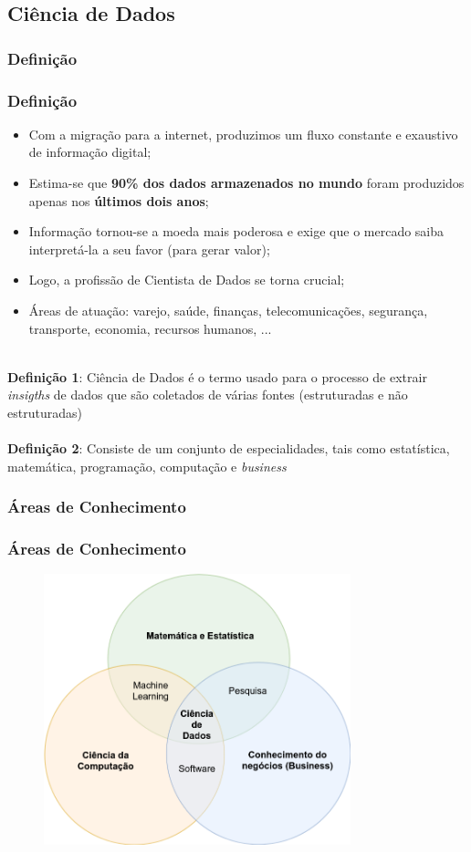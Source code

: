 \documentclass[10pt,xcolor=table]{beamer}
\begin{document}
\subsection{Ciência de Dados}
\subsubsection{Definição}
\begin{frame}\frametitle{Definição} 
  \begin{itemize}
    \item Com a migração para a internet, produzimos um fluxo constante e exaustivo de informação digital;
    \item Estima-se que \textbf{90\% dos dados armazenados no mundo} foram produzidos apenas nos \textbf{últimos dois anos};
    \item Informação tornou-se a moeda mais poderosa e exige que o mercado saiba interpretá-la a seu favor (para gerar valor);
    \item Logo, a profissão de Cientista de Dados se torna crucial;
    \item Áreas de atuação: varejo, saúde, finanças, telecomunicações, segurança, transporte, economia, recursos humanos, ...\\~\\
  \end{itemize}
\textbf{Definição 1}: Ciência de Dados é o termo usado para o processo de extrair \emph{insigths} de dados que são coletados de várias fontes (estruturadas e não estruturadas) \\~\\
\textbf{Definição 2}: Consiste de um conjunto de especialidades, tais como estatística, matemática, programação, computação e \emph{business}
\end{frame}

\subsubsection{Áreas de Conhecimento}
\begin{frame}\frametitle{Áreas de Conhecimento} 
  \begin{figure}[hb]
    \includegraphics[width=3.5in]{Figure/CientistadeDados.png}
  \end{figure}
\end{frame}
\end{document}
